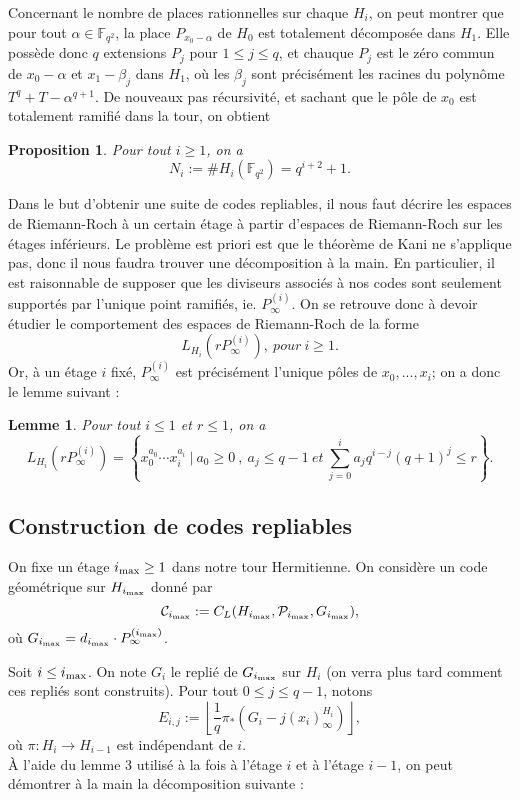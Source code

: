 \documentclass[10pt]{article}
\newtheorem{prop1}{Proposition}[]
\newtheorem{lem1}{Lemme}[]
\newcommand{\s}{\vspace{0.3cm}}
\newcommand{\cd}{\cdot}
\newcommand{\PR}{\mathcal{P}}
\newcommand{\ii}{i_{\rm{max}}}
\begin{document}
Concernant le nombre de places rationnelles sur chaque $H_i$, on peut montrer que pour tout $\alpha \in \mathbb{F}_{q^2}$, la place $P_{x_0-\alpha}$ de $H_0$ est totalement décomposée dans $H_1$. Elle possède donc $q$ extensions $P_j$ pour $1 \leq j \leq q$, et chauque $P_j$ est le zéro commun de $x_0-\alpha$ et $x_1-\beta_j$ dans $H_1$, où les $\beta_j$ sont précisément les racines du polynôme $T^q+T-\alpha^{q+1}$. De nouveaux pas récursivité, et sachant que le pôle de $x_0$ est totalement ramifié dans la tour, on obtient

\begin{prop1}
Pour tout $i \geq 1$, on a
\[N_i := \#H_i(\mathbb{F}_{q^2}) = q^{i+2}+1.\]
\end{prop1}

Dans le but d'obtenir une suite de codes repliables, il nous faut décrire les espaces de Riemann-Roch à un certain étage à partir d'espaces de Riemann-Roch sur les étages inférieurs. Le problème est priori est que le théorème de Kani ne s'applique pas, donc il nous faudra trouver une décomposition à la main. En particulier, il est raisonnable de supposer que les diviseurs associés à nos codes sont seulement supportés par l'unique point ramifiés, ie. $P^{(i)}_{\infty}$. On se retrouve donc à devoir étudier le comportement des espaces de Riemann-Roch de la forme 
\[L_{H_i}\left(rP^{(i)}_{\infty}\right), \ pour \ i \geq 1.\] 
Or, à un étage $i$ fixé, $P^{(i)}_{\infty}$ est précisément l'unique pôles de $x_0,...,x_i$; on a donc le lemme suivant :

\begin{lem1}
Pour tout $i \leq 1$ et $r \leq 1$, on a 
\[L_{H_i}(rP^{(i)}_{\infty}) = \left\{x_0^{a_0} \cdots x_i^{a_i} \ | \ a_0 \geq 0 \ , \ a_j \leq q-1 \ et \ \sum\limits_{j=0}^i a_jq^{i-j}(q+1)^j \leq r \right\}.\]
\end{lem1}

\s

\subsection{Construction de codes repliables}

\s

On fixe un étage $\ii \geq 1$ dans notre tour Hermitienne. On considère un code géométrique sur $H_{\ii}$ donné par 
\[\mathcal{C}_{\ii} := C_L(H_{\ii},\PR_{\ii},G_{\ii}),\]
où $G_{\ii} = d_{\ii} \cd P^{(\ii)}_{\infty}$.

\s

Soit $i \leq \ii$. On note $G_i$ le replié de $G_{\ii}$ sur $H_i$ (on verra plus tard comment ces repliés sont construits). Pour tout $0 \leq j \leq q-1$, notons 
\[E_{i,j} := \left\lfloor \frac{1}{q} \pi_*\left(G_i-j(x_i)^{H_i}_{\infty}\right)\right\rfloor,\]
où $\pi : H_i \rightarrow H_{i-1}$ est indépendant de $i$. \\ 
À l'aide du lemme 3 utilisé à la fois à l'étage $i$ et à l'étage $i-1$, on peut démontrer à la main la décomposition suivante :
\end{document}
